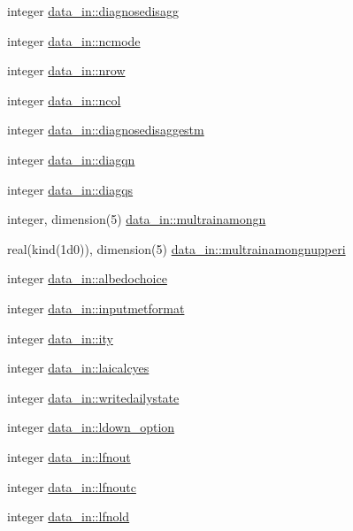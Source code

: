 \begin{DoxyCompactItemize}
\item 
integer \hyperlink{namespacedata__in_a4083646fdfcd997307f15597aa4ec662}{data\+\_\+in\+::diagnosedisagg}
\item 
integer \hyperlink{namespacedata__in_a8c3e4136805b6c64af2129539988ed09}{data\+\_\+in\+::ncmode}
\item 
integer \hyperlink{namespacedata__in_ab7209967962bb333a35a29bb6a24eb36}{data\+\_\+in\+::nrow}
\item 
integer \hyperlink{namespacedata__in_abcffd65e274aa3e20c73561543853e19}{data\+\_\+in\+::ncol}
\item 
integer \hyperlink{namespacedata__in_ae4cd527d8942c93e41e59584292f2d9c}{data\+\_\+in\+::diagnosedisaggestm}
\item 
integer \hyperlink{namespacedata__in_a2d6b128b5a2c8b851ee4fdd38204a18f}{data\+\_\+in\+::diagqn}
\item 
integer \hyperlink{namespacedata__in_a2202e62dbdf6e4d935d472a09af97460}{data\+\_\+in\+::diagqs}
\item 
integer, dimension(5) \hyperlink{namespacedata__in_a418fc51e58d7116a1764af37aba7b65f}{data\+\_\+in\+::multrainamongn}
\item 
real(kind(1d0)), dimension(5) \hyperlink{namespacedata__in_a3473c34f53886b8fc852e23b09fc2add}{data\+\_\+in\+::multrainamongnupperi}
\item 
integer \hyperlink{namespacedata__in_a95db274f3821ba4b3b2799481c2484f7}{data\+\_\+in\+::albedochoice}
\item 
integer \hyperlink{namespacedata__in_a4abd9462bcbb39b3cab15d64ebe71995}{data\+\_\+in\+::inputmetformat}
\item 
integer \hyperlink{namespacedata__in_a71e2da70dfd1593a6a4770f164bcc146}{data\+\_\+in\+::ity}
\item 
integer \hyperlink{namespacedata__in_a3c3027e7975cd18122a58ae965ee0f86}{data\+\_\+in\+::laicalcyes}
\item 
integer \hyperlink{namespacedata__in_adf35232d8407e784ed41dc8f09ffe171}{data\+\_\+in\+::writedailystate}
\item 
integer \hyperlink{namespacedata__in_a7ee5c5c530300f6627f86b6cbde2d5b9}{data\+\_\+in\+::ldown\+\_\+option}
\item 
integer \hyperlink{namespacedata__in_ad453037bad2cda84e61ec000bdd004aa}{data\+\_\+in\+::lfnout}
\item 
integer \hyperlink{namespacedata__in_a0189adce2d060aee708a9216b5c771e2}{data\+\_\+in\+::lfnoutc}
\item 
integer \hyperlink{namespacedata__in_a3b953424146f8076e9fec820cd6f31d2}{data\+\_\+in\+::lfnold}

\end{DoxyCompactItemize}
